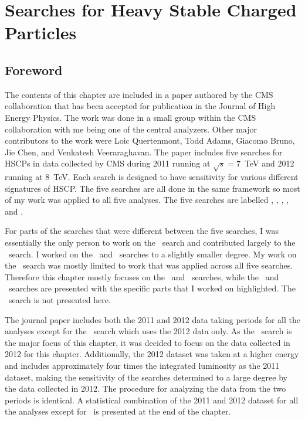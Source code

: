 \chapter{Searches for Heavy Stable Charged Particles \label{sec:search}}

\section{Foreword}
The contents of this chapter are included in a paper authored by the CMS collaboration that has been accepted for publication in the Journal of High Energy Physics.
The work was done in a small group within the CMS collaboration with me being one of the central analyzers.
Other major contributors to the work were Loic Quertenmont, Todd Adams, Giacomo Bruno, Jie Chen, and Venkatesh Veeraraghavan.
The paper includes five searches for HSCPs in data collected by CMS during 2011 running at $\sqrt{s}=7$~TeV and 2012 running at 8~TeV.
Each search is designed to have sensitivity for various different signatures of HSCP. 
The five searches are all done in the same framework
so most of my work was applied to all five analyses. The five searches are labelled \muononly, \tktof, \tkonly, \multi, and \fract. 

For parts of the searches that were different between the five searches,
I was essentially the only person to work on the \muononly\ search and contributed largely to the \tktof\ search.
I worked on the \tkonly\ and \multi\ searches to a slightly smaller degree. My work on the \fract\ search was mostly limited to work that was applied across all five searches. 
Therefore this chapter mostly focuses on the \muononly\ and \tktof\ searches, while the \tkonly\ and \multi\ searches are presented
with the specific parts that I worked on highlighted. The \fract\ search is not presented here.

The journal paper includes both the 2011 and 2012 data taking periods for all the analyses except for the \muononly\ search which uses the 2012 data only. 
As the \muononly\ search is the major focus of this chapter, it was decided to focus on the data collected in 2012 for this chapter.
Additionally, the 2012 dataset was taken at a higher energy and includes approximately four times the integrated luminosity as the 2011 dataset,
making the sensitivity of the searches determined to a large degree by the data collected in 2012.
The procedure for analyzing the data from the two periods is identical.
A statistical combination of the 2011 and 2012 dataset for all the analyses except for \muononly\ is presented at the end of the chapter. 

